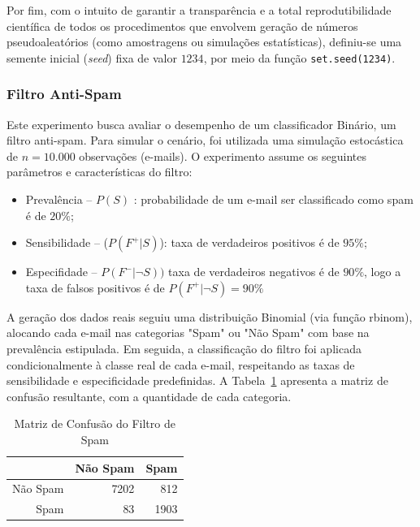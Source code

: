Por fim, com o intuito de garantir a transparência e a total reprodutibilidade científica de todos os procedimentos que envolvem geração de números pseudoaleatórios (como amostragens ou simulações estatísticas), definiu-se uma semente inicial (\textit{seed}) fixa de valor $1234$, por meio da função \texttt{set.seed(1234)}.

\subsubsection{Filtro Anti-Spam}


Este experimento busca avaliar o desempenho de um classificador Binário, um filtro anti-spam. Para simular o cenário, foi utilizada uma simulação estocástica de $n = 10.000$ observações (e-mails). O experimento assume os seguintes parâmetros e características do filtro: 

\begin{itemize}
	\item Prevalência -- $P(S)$ : probabilidade de um e-mail ser classificado como spam é de $20\%$;
	\item Sensibilidade --  ($P(F^+|S)$): taxa de verdadeiros positivos é de $95\%$;
	\item Especifidade -- $P(F^-|\neg S))$  taxa de verdadeiros negativos é de $90\%$, logo a taxa de falsos positivos é de $P(F^+|\neg S) = 90\%$ 

\end{itemize}

A geração dos dados reais seguiu uma distribuição Binomial (via função rbinom), alocando cada e-mail nas categorias "Spam" ou "Não Spam" com base na prevalência estipulada. Em seguida, a classificação do filtro foi aplicada condicionalmente à classe real de cada e-mail, respeitando as taxas de sensibilidade e especificidade predefinidas. A Tabela~\ref{tab:matriz_confusao} apresenta a matriz de confusão resultante, com a quantidade de cada categoria.

\begin{table}[ht]
	\centering
	\begin{tabular}{rrr}
		\hline
		& Não Spam & Spam \\ 
		\hline
		Não Spam & 7202 & 812 \\ 
		Spam &  83 & 1903 \\ 
		\hline
	\end{tabular}
	\caption{Matriz de Confusão do Filtro de Spam} 
	\label{tab:matriz_confusao}
\end{table}



